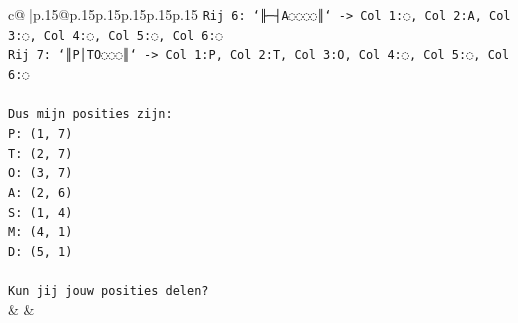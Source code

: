 \documentclass{article}
\begin{document}
{\begin{supertabular}{c@{$\;$}|p{.15\linewidth}@{}p{.15\linewidth}p{.15\linewidth}p{.15\linewidth}p{.15\linewidth}p{.15\linewidth}}
{{{\texttt{Rij 6: `╟─┤A◌◌◌◌║` {-}> Col 1:◌, Col 2:A, Col 3:◌, Col 4:◌, Col 5:◌, Col 6:◌} \\
\texttt{Rij 7: `║P│TO◌◌◌║` {-}> Col 1:P, Col 2:T, Col 3:O, Col 4:◌, Col 5:◌, Col 6:◌} \\
\\ 
\texttt{Dus mijn posities zijn:} \\
\texttt{P: (1, 7)} \\
\texttt{T: (2, 7)} \\
\texttt{O: (3, 7)} \\
\texttt{A: (2, 6)} \\
\texttt{S: (1, 4)} \\
\texttt{M: (4, 1)} \\
\texttt{D: (5, 1)} \\
\\ 
\texttt{Kun jij jouw posities delen?} \\
            }
        }
    }
    & & \\ \\


\end{supertabular}}
\end{document}

